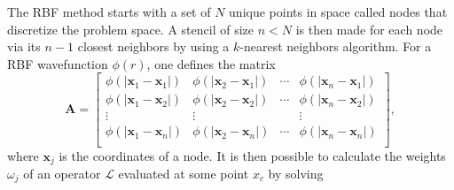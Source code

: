 The RBF method starts with a set of $N$ unique points in space called nodes that discretize the problem space. A stencil of size $n<N$ is then made for each node via its $n-1$ closest neighbors by using a $k$-nearest neighbors algorithm. For a RBF wavefunction $\phi(r)$, one defines the matrix
\begin{equation}
\mathbf{A} = 
\begin{bmatrix}
    \phi(|\mathbf{x}_1-\mathbf{x}_1|) & \phi(|\mathbf{x}_2-\mathbf{x}_1|)  & \cdots & \phi(|\mathbf{x}_n-\mathbf{x}_1|) \\
    \phi(|\mathbf{x}_1-\mathbf{x}_2|) & \phi(|\mathbf{x}_2-\mathbf{x}_2|)  & \cdots & \phi(|\mathbf{x}_n-\mathbf{x}_2|) \\
    \vdots & \vdots  & & \vdots  \\
    \phi(|\mathbf{x}_1-\mathbf{x}_n|) & \phi(|\mathbf{x}_2-\mathbf{x}_n|)  & \cdots & \phi(|\mathbf{x}_n-\mathbf{x}_n|) \\
\end{bmatrix},
\label{eq:rbf_matrix}
\end{equation}
where $\mathbf{x}_j$ is the coordinates of a node. It is then possible to calculate the weights $\omega_j$ of an operator $\mathcal{L}$ evaluated at some point $x_c$ by solving
